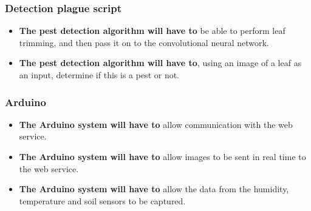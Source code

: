 \documentclass[11pt,a4paper]{article}
\begin{document}
\subsubsection{Detection plague script}
\begin{itemize}
\item \textbf{The pest detection algorithm will have to} be able to perform leaf trimming, and then pass it on to the convolutional neural network.

\item \textbf{The pest detection algorithm will have to}, using an image of a leaf as an input, determine if this is a pest or not.
\end{itemize}

\subsubsection{Arduino}
\begin{itemize}
\item \textbf{The Arduino system will have to} allow communication with the web service.

\item \textbf{The Arduino system will have to} allow images to be sent in real time to the web service.

\item \textbf{The Arduino system will have to} allow the data from the humidity, temperature and soil sensors to be captured.

\end{itemize}

\end{document}
